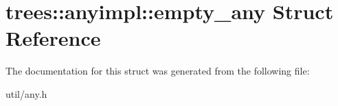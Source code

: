 \hypertarget{structtrees_1_1anyimpl_1_1empty__any}{}\section{trees\+:\+:anyimpl\+:\+:empty\+\_\+any Struct Reference}
\label{structtrees_1_1anyimpl_1_1empty__any}


The documentation for this struct was generated from the following file\+:\begin{DoxyCompactItemize}
\item 
util/any.\+h\end{DoxyCompactItemize}
